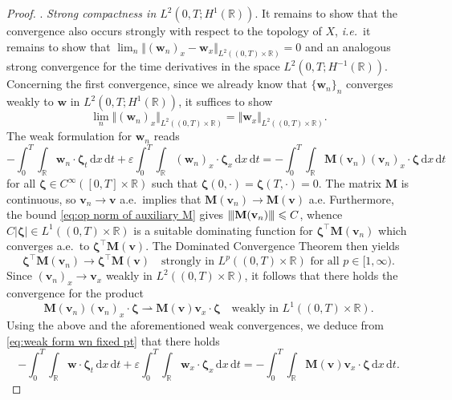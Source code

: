 \documentclass[11pt,a4paper,reqno]{amsart}
\numberwithin{equation}{section}
\theoremstyle{definition}
\theoremstyle{remark}
\newcommand{\vertiii}[1]{{\left\vert\kern-0.25ex\left\vert\kern-0.25ex\left\vert #1 
    \right\vert\kern-0.25ex\right\vert\kern-0.25ex\right\vert}}
\newcommand{\bv}{\mathbf{v}}
\newcommand{\bw}{\mathbf{w}}
\renewcommand{\d}{\, \mathrm{d}}
\newcommand{\bM}{\mathbf{M}}
\newcommand{\bzeta}{\boldsymbol{\zeta}}
\renewcommand{\leq}{\leqslant}
\begin{document}
{\begin{proof}
\smallskip 
{}. \textit{Strong compactness in $L^2(0,T;H^1(\mathbb{R}))$}. It remains to show that the convergence also occurs strongly with respect to the topology of $X$, \textit{i.e.}~it remains to show that $\lim_n \Vert (\bw_n)_x - \bw_x \Vert_{L^2((0,T)\times\mathbb{R})} = 0$ and an analogous strong convergence for the time derivatives in the space $L^2(0,T;H^{-1}(\mathbb{R}))$. Concerning the first convergence, since we already know that $\{\bw_n\}_n$ converges weakly to $\bw$ in $L^2(0,T;H^1(\mathbb{R}))$, it suffices to show 
\begin{equation}\label{eq:required strong conv for cpct fixed pt}
    \lim_n \Vert (\bw_n)_x \Vert_{L^2((0,T)\times\mathbb{R})} = \Vert \bw_x \Vert_{L^2((0,T)\times\mathbb{R})}. 
\end{equation}
The weak formulation for $\bw_n$ reads 
\begin{equation}\label{eq:weak form wn fixed pt}
   -\int_0^T \int_\mathbb{R} \bw_n \cdot \bzeta_t \d x \d t + \varepsilon \int_0^T \int_\mathbb{R} (\bw_n)_x \cdot \bzeta_x \d x \d t = - \int_0^T \int_\mathbb{R} \bM(\bv_n) (\bv_n)_x \cdot \bzeta \d x \d t 
\end{equation}
for all $\bzeta \in C^\infty([0,T]\times\mathbb{R})$ such that $\bzeta(0,\cdot)=\bzeta(T,\cdot) = 0$. The matrix $\bM$ is continuous, so $\bv_n \to \bv$ a.e.~implies that $\bM(\bv_n) \to \bM(\bv)$ a.e. Furthermore, the bound \eqref{eq:op norm of auxiliary M} gives $\vertiii{\bM(\bv_n)} \leq C$, whence $C|\bzeta| \in L^1((0,T)\times\mathbb{R})$ is a suitable dominating function for $\bzeta^\intercal \bM(\bv_n)$ which converges a.e.~to $\bzeta^\intercal \bM(\bv)$. The Dominated Convergence Theorem then yields 
\begin{equation*}
    \bzeta^\intercal \bM(\bv_n) \to \bzeta^\intercal \bM(\bv) \quad \text{strongly in } L^p((0,T)\times\mathbb{R}) \text{ for all } p \in [1,\infty). 
\end{equation*}
Since $(\bv_n)_x \to \bv_x$ weakly in $L^2((0,T)\times\mathbb{R})$, it follows that there holds the convergence for the product 
\begin{equation*}
    \bM(\bv_n) (\bv_n)_x \cdot \bzeta \rightharpoonup \bM(\bv) \bv_x \cdot \bzeta \quad \text{weakly in } L^1((0,T)\times\mathbb{R}). 
\end{equation*}
Using the above and the aforementioned weak convergences, we deduce from \eqref{eq:weak form wn fixed pt} that there holds 
\begin{equation}\label{eq:weak form w fixed pt}
   -\int_0^T \int_\mathbb{R} \bw \cdot \bzeta_t \d x \d t + \varepsilon \int_0^T \int_\mathbb{R} \bw_x \cdot \bzeta_x \d x \d t = - \int_0^T \int_\mathbb{R} \bM(\bv) \bv_x \cdot \bzeta \d x \d t. 

\end{equation}
\end{proof}}
\end{document}
